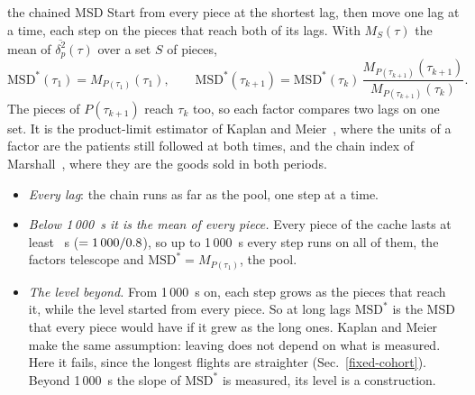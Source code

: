 \documentclass[10pt,a4paper]{article}
\begin{document}
\begin{method}{the chained MSD}
  Start from every piece at the shortest lag, then move one lag at a time, each step on the pieces that reach
  both of its lags. With $M_S(\tau)$ the mean of $\overline{\delta^2_p}(\tau)$ over a set $S$ of pieces,
  \[ \mathrm{MSD}^*(\tau_1)=M_{P(\tau_1)}(\tau_1),\qquad
     \mathrm{MSD}^*(\tau_{k+1})=\mathrm{MSD}^*(\tau_k)\,\frac{M_{P(\tau_{k+1})}(\tau_{k+1})}{M_{P(\tau_{k+1})}(\tau_k)}. \]
  The pieces of $P(\tau_{k+1})$ reach $\tau_k$ too, so each factor compares two lags on one set. It is the
  product-limit estimator of Kaplan and Meier~\cite{kaplan1958}, where the units of a factor are the patients
  still followed at both times, and the chain index of Marshall~\cite{marshall1887}, where they are the goods
  sold in both periods.
  \begin{itemize}
  \item \emph{Every lag}: the chain runs as far as the pool, one step at a time.
  \item \emph{Below 1\,000~s it is the mean of every piece.} Every piece of the cache lasts at least \PieceMinS~s
    ($=1\,000/0.8$), so up to 1\,000~s every step runs on all of them, the factors telescope and
    $\mathrm{MSD}^*=M_{P(\tau_1)}$, the pool.
  \item \emph{The level beyond.} From 1\,000~s on, each step grows as the pieces that reach it, while the level
    started from every piece. So at long lags $\mathrm{MSD}^*$ is the MSD that every piece would have if it grew
    as the long ones. Kaplan and Meier make the same assumption: leaving does not depend on what is measured.
    Here it fails, since the longest flights are straighter (Sec.~\ref{fixed-cohort}). Beyond 1\,000~s the slope
    of $\mathrm{MSD}^*$ is measured, its level is a construction.
  \end{itemize}
\end{method}
\end{document}
